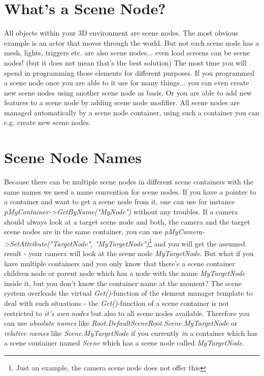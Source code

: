 \section{What's a Scene Node?}
All objects within your 3D environment are scene nodes. The most obvious example is an actor that moves through the world. But not each scene node has a mesh, lights, triggers etc. are also scene nodes... even load screens can be scene nodes! (but it does not mean that's the best solution) The most time you will spend in programming those elements for different purposes. If you programmed a scene node once you are able to it use for many things... you can even create new scene nodes using another scene node as basis. Or you are able to add new features to a scene node by adding scene node modifier. All scene nodes are managed automatically by a scene node container, using such a container you can e.g. create new scene nodes.




\section{Scene Node Names}
Because there can be multiple scene nodes in different scene containers with the same names we need a name convention for scene nodes. If you have a pointer to a container and want to get a scene node from it, one can use for instance \emph{pMyContainer->GetByName("MyNode")} without any troubles. If a camera should always look at a target scene node and both, the camera and the target scene nodes are in the same container, you can use \emph{pMyCamera->SetAttribute("TargetNode", "MyTargetNode")}\footnote{Just an example, the camera scene node does not offer this} and you will get the assumed result - your camera will look at the scene node \emph{MyTargetNode}. But what if you have multiple containers and you only know that there's a scene container children node or parent node which has a node with the name \emph{MyTargetNode} inside it, but you don't know the container name at the moment? The scene system overloads the virtual \emph{Get()}-function of the element manager template to deal with such situations - the \emph{Get()}-function of a scene container is not restricted to \emph{it's own nodes} but also to all scene nodes available. Therefore you can use \emph{absolute names} like \emph{Root.DefaultSceneRoot.Scene.MyTargetNode} or \emph{relative names} like \emph{Scene.MyTargetNode} if you currently \emph{in} a container which has a scene container named \emph{Scene} which has a scene node called \emph{MyTargetNode}.

